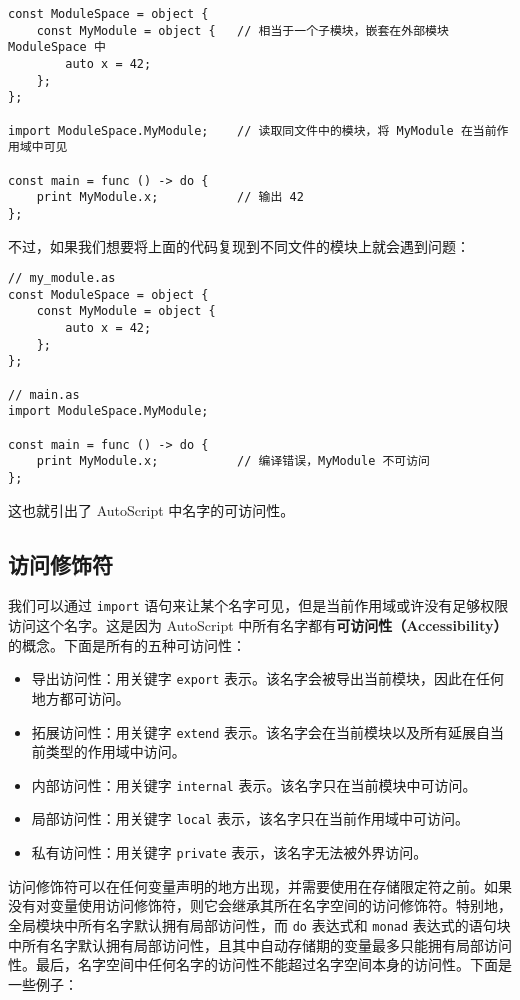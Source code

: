 \begin{lstlisting}
const ModuleSpace = object {
	const MyModule = object {	// 相当于一个子模块，嵌套在外部模块 ModuleSpace 中
		auto x = 42;
	};
};

import ModuleSpace.MyModule;	// 读取同文件中的模块，将 MyModule 在当前作用域中可见

const main = func () -> do {
	print MyModule.x;			// 输出 42
};
\end{lstlisting}

不过，如果我们想要将上面的代码复现到不同文件的模块上就会遇到问题：

\begin{lstlisting}
// my_module.as
const ModuleSpace = object {
	const MyModule = object {
		auto x = 42;
	};
};

// main.as
import ModuleSpace.MyModule;

const main = func () -> do {
	print MyModule.x;			// 编译错误，MyModule 不可访问
};
\end{lstlisting}

这也就引出了 AutoScript 中名字的可访问性。

\subsection{访问修饰符}

我们可以通过 \lstinline!import! 语句来让某个名字可见，但是当前作用域或许没有足够权限访问这个名字。这是因为 AutoScript 中所有名字都有\textbf{可访问性（Accessibility）}的概念。下面是所有的五种可访问性：

\begin{itemize}
	\item 导出访问性：用关键字 \lstinline!export! 表示。该名字会被导出当前模块，因此在任何地方都可访问。
	\item 拓展访问性：用关键字 \lstinline!extend! 表示。该名字会在当前模块以及所有延展自当前类型的作用域中访问。
	\item 内部访问性：用关键字 \lstinline!internal! 表示。该名字只在当前模块中可访问。
	\item 局部访问性：用关键字 \lstinline!local! 表示，该名字只在当前作用域中可访问。
	\item 私有访问性：用关键字 \lstinline!private! 表示，该名字无法被外界访问。
\end{itemize}

访问修饰符可以在任何变量声明的地方出现，并需要使用在存储限定符之前。如果没有对变量使用访问修饰符，则它会继承其所在名字空间的访问修饰符。特别地，全局模块中所有名字默认拥有局部访问性，而 \lstinline!do! 表达式和 \lstinline!monad! 表达式的语句块中所有名字默认拥有局部访问性，且其中自动存储期的变量最多只能拥有局部访问性。最后，名字空间中任何名字的访问性不能超过名字空间本身的访问性。下面是一些例子：

